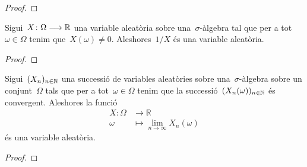 \documentclass[../../main.tex]{subfiles}
\begin{document}
    \begin{proof}
    \end{proof}
    \begin{proposition}
        \label{prop:les-variables-aleatories-formen-un-cos}
        Sigui~\(X\colon\Omega\longrightarrow\mathbb{R}\) una variable aleatòria sobre una~\(\sigma\)-àlgebra tal que per a tot~\(\omega\in\Omega\) tenim que~\(X(\omega)\neq0\).
        Aleshores~\(1/X\) és una variable aleatòria.
    \end{proposition}
    \begin{proof}
    \end{proof}
    \begin{proposition}
        \label{prop:el-cos-de-variables-aleatories-es-tancat}
        Sigui~\((X_{n})_{n\in\mathbb{N}}\) una successió de variables aleatòries sobre una~\(\sigma\)-àlgebra sobre un conjunt~\(\Omega\) tals que per a tot~\(\omega\in\Omega\) tenim que la successió~\((X_{n}(\omega))_{n\in\mathbb{N}}\) és convergent.
        Aleshores la funció
        \begin{align*}
            X\colon\Omega&\longrightarrow\mathbb{R} \\
            \omega&\longmapsto\lim_{n\to\infty}X_{n}(\omega)
        \end{align*}
        és una variable aleatòria.
    \end{proposition}
    \begin{proof}
    \end{proof}
\end{document}
